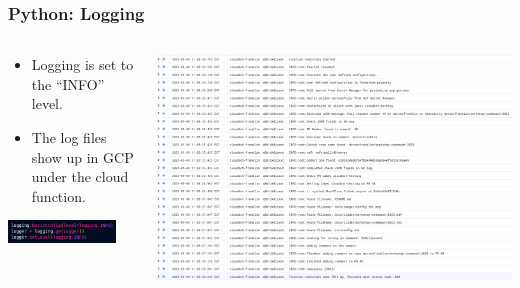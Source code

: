 \documentclass[aspectratio=169]{beamer}
\begin{document}
\begin{frame}
	\frametitle{Python: Logging}
	\begin{columns}
		\begin{column}{0.5\textwidth}
			\begin{itemize}
				\item Logging is set to the ``INFO'' level.
				\item The log files show up in GCP under the cloud function.
			\end{itemize}
			\begin{center}
				\includegraphics[width=0.85\textwidth]{../images/logging.png}
			\end{center}
		\end{column}
		\begin{column}{0.5\textwidth}
			\begin{center}
				\includegraphics[width=1.2\textwidth]{../images/cloud-function-logs.png}
			\end{center}
		\end{column}
	\end{columns}
\end{frame}
\end{document}
